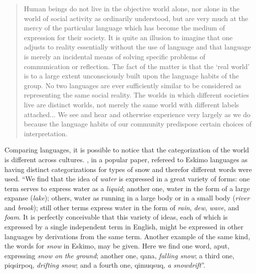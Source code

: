 \begin{quote}
Human beings do not live in the objective world alone, nor alone in the world of social activity as ordinarily understood, 
but are very much at the mercy of the particular language which has become the medium of expression for their society. 
It is quite an illusion to imagine that one adjusts to reality essentially without the use of language and that language 
is merely an incidental means of solving specific problems of communication or reflection. The fact of the matter is that 
the `real world' is to a large extent unconsciously built upon the language habits of the group. No two languages are ever 
sufficiently similar to be considered as representing the same social reality. The worlds in which different societies live 
are distinct worlds, not merely the same world with different labels attached... We see and hear and otherwise experience 
very largely as we do because the language habits of our community predispose certain choices of interpretation. \citep{sapir1929}
\end{quote}



Comparing languages, it is possible to notice that the categorization of the world is different across cultures. 
\cite{whorf1940}, in a popular paper, refereed to Eskimo languages as having distinct categorizations 
for types of snow and therefor different words were used.
``We find that the idea of \textit{water} is expressed in a great variety of forms: 
one term serves to express water as a \textit{liquid}; another one, water in the form of a large expanse (\textit{lake});
others, water as running in a large body or in a small body (\textit{river} and \textit{brook}); 
still other terms express water in the form of \textit{rain}, \textit{dew}, \textit{wave}, and \textit{foam}. 
It is perfectly conceivable that this variety of ideas, each of which is expressed by a single independent term in English, 
might be expressed in other languages by derivations from the same term. Another example of the same kind, the words for 
\textit{snow} in Eskimo, may be given. Here we find one word, aput, expressing \textit{snow on the ground}; 
another one, qana, \textit{falling snow}; a third one, piqsirpoq, \textit{drifting snow}; and a fourth one, 
qimuqsuq, \textit{a snowdrift}''\citep{boas1911}.


